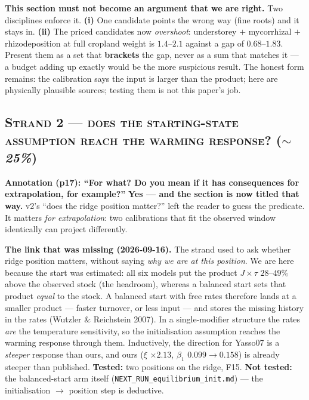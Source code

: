 \documentclass[11pt]{article}
\begin{document}
\begin{warn}
\textbf{This section must not become an argument that we are right.} Two disciplines enforce it.
\textbf{(i)} One candidate points the wrong way (fine roots) and it stays in. \textbf{(ii)} The
priced candidates now \emph{overshoot}: understorey $+$ mycorrhizal $+$ rhizodeposition at full
cropland weight is $1.4$--$2.1$ against a gap of $0.68$--$1.83$. Present them as a set that
\textbf{brackets} the gap, never as a sum that matches it --- a budget adding up exactly would be the
more suspicious result. The honest form remains: the calibration says the input is larger than the
product; here are physically plausible sources; testing them is not this paper's job.
\end{warn}

\subsection*{\textsc{Strand 2 --- does the starting-state assumption reach the warming response?} \normalfont(\emph{$\sim$25\%})}

\begin{ann}
\textbf{Annotation (p17): ``For what? Do you mean if it has consequences for extrapolation, for
example?''} \textbf{Yes --- and the section is now titled that way.} v2's ``does the ridge position
matter?'' left the reader to guess the predicate. It matters \emph{for extrapolation}: two
calibrations that fit the observed window identically can project differently.
\end{ann}

\begin{note}
\textbf{The link that was missing (2026-09-16).} The strand used to ask whether ridge position
matters, without saying \emph{why we are at this position}. We are here because the start was
estimated: all six models put the product $J\times\tau$ $28$--$49\%$ above the observed stock (the
headroom), whereas a balanced start sets that product \emph{equal} to the stock. A balanced start with
free rates therefore lands at a smaller product --- faster turnover, or less input --- and stores the
missing history in the rates (Wutzler \& Reichstein 2007). In a single-modifier structure the rates
\emph{are} the temperature sensitivity, so the initialisation assumption reaches the warming response
through them. Inductively, the direction for Yasso07 is a \emph{steeper} response than ours, and ours
($\xi$ $\times 2.13$, $\beta_1$ $0.099 \to 0.158$) is already steeper than published. \textbf{Tested:}
two positions on the ridge, F15. \textbf{Not tested:} the balanced-start arm itself
(\texttt{NEXT\_RUN\_equilibrium\_init.md}) --- the initialisation $\to$ position step is deductive.
\end{note}
\end{document}
